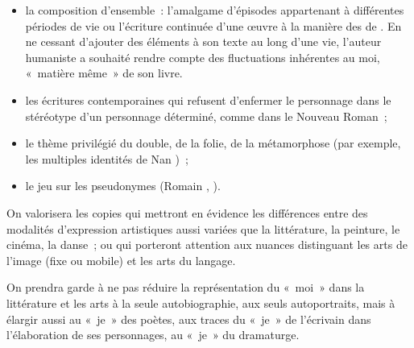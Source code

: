{\begin{itemize}[label=$\bullet$]
\begin{itemize}
\item la composition d'ensemble~: l'amalgame d'épisodes appartenant à différentes
périodes de vie ou l'écriture continuée d'une œuvre à la manière des  de
. En ne cessant d'ajouter des éléments à son texte au long d'une vie, l'auteur
humaniste a souhaité rendre compte des fluctuations inhérentes au moi, «~matière
même~» de son livre.

\item les écritures contemporaines qui refusent d'enfermer le personnage dans le
stéréotype d'un personnage  déterminé, comme dans le Nouveau Roman~;

\item le thème privilégié du double, de la folie, de la métamorphose (par exemple, les multiples identités de Nan )~;

\item le jeu sur les pseudonymes (Romain , ).

\end{itemize}

\end{itemize}

On valorisera les copies qui mettront en évidence les différences entre des modalités
d'expression artistiques aussi variées que la littérature, la peinture, le cinéma, la
danse~; ou qui porteront attention aux nuances distinguant les arts de l'image (fixe ou
mobile) et les arts du langage.

On prendra garde à ne pas réduire la représentation du «~moi~» dans la littérature et
les arts à la seule autobiographie, aux seuls autoportraits, mais à élargir aussi au «~je~»
des poètes, aux traces du «~je~» de l'écrivain dans l'élaboration de ses personnages,
au «~je~» du dramaturge.}%
\vfill{~}\clearpage
